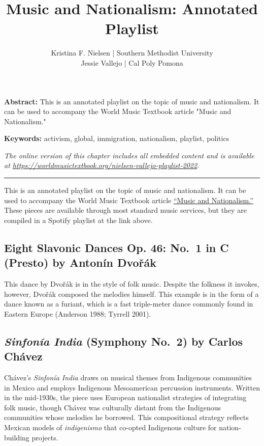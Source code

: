 \documentclass[twoside]{article}
\title{Music and Nationalism: Annotated Playlist}
\author{Kristina F. Nielsen | Southern Methodist University\\Jessie Vallejo | Cal Poly Pomona}
\date{}
\makeatletter
\renewcommand{\maketitle}{\bgroup\setlength{\parindent}{0pt}
\begin{flushleft}
  \vspace*{3\baselineskip}
  \huge{\textbf{\@title}}

  \medskip
  
  \large{\@author}
\end{flushleft}\egroup
}
\providecommand{\abstracttext}[1]
{
  \noindent
  \textbf{Abstract:} #1
}
\providecommand{\keywords}[1]
{
  \newline
  \textbf{Keywords:} #1
}
\providecommand{\wmturl}{\href{https://worldmusictextbook.org/nielsen-vallejo-playlist-2022}{https://worldmusictextbook.org/nielsen-vallejo-playlist-2022}}
\providecommand{\wmturltext}{
  \noindent\emph{The online version of this chapter includes all embedded content and is available at \wmturl.}
}
\makeatother
\begin{document}
\suppressfloats %
\maketitle

\abstracttext{This is an annotated playlist on the topic of music and nationalism. It can be used to accompany the World Music Textbook article "Music and Nationalism."}
\keywords{activism, global, immigration, nationalism, playlist, politics}

\smallskip

\wmturltext

\medskip

\noindent\hfil\rule{0.5\textwidth}{0.4pt}\hfil

\bigskip

\noindent
This is an annotated playlist on the topic of music and nationalism. It
can be used to accompany the World Music Textbook article
\href{https://worldmusictextbook.org/nielsen-vallejo-2022}{``Music and Nationalism.''} These
pieces are available through most standard music services, but they are
compiled in a Spotify playlist at the link above.

\hypertarget{eight-slavonic-dances-op.-46-no.-1-in-c-presto-by-antonuxedn-dvoux159uxe1k}{%
\subsection*{Eight Slavonic Dances Op. 46: No.~1 in C (Presto) by
Antonín
Dvo\v{r}ák}\label{eight-slavonic-dances-op.-46-no.-1-in-c-presto-by-antonuxedn-dvoux159uxe1k}}

This dance by Dvo\v{r}ák is in the style of folk music. Despite the folkness
it invokes, however, Dvo\v{r}ák composed the melodies himself. This example
is in the form of a dance known as a furiant, which is a fast
triple-meter dance commonly found in Eastern Europe (Anderson 1988;
Tyrrell 2001).~

\hypertarget{sinfonuxeda-india-symphony-no.-2-by-carlos-chuxe1vez}{%
\subsection*{\texorpdfstring{\emph{Sinfonía India} (Symphony No.~2) by
Carlos
Chávez}{Sinfonía India (Symphony No.~2) by Carlos Chávez}}\label{sinfonuxeda-india-symphony-no.-2-by-carlos-chuxe1vez}}

Chávez's \emph{Sinfonía India} draws on musical themes from Indigenous
communities in Mexico and employs Indigenous Mesoamerican percussion
instruments. Written in the mid-1930s, the piece uses European
nationalist strategies of integrating folk music, though Chávez was
culturally distant from the Indigenous communities whose melodies he
borrowed. This compositional strategy reflects Mexican models of
\emph{indigenismo} that co-opted Indigenous culture for nation-building
projects.~~
\end{document}
